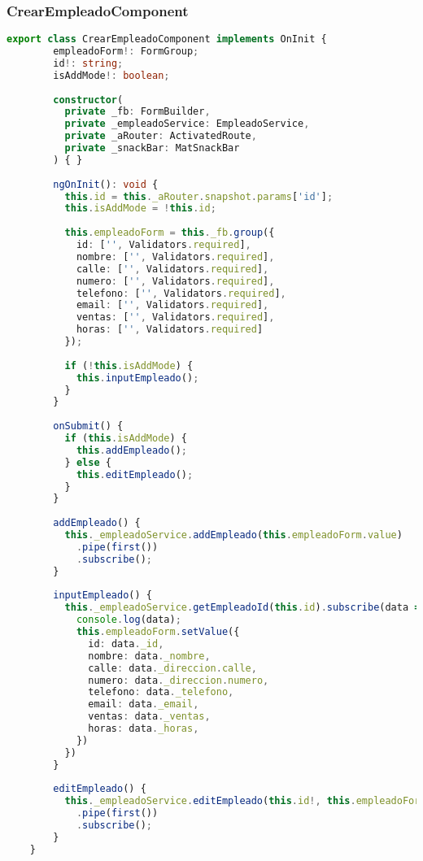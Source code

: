 \documentclass[a4paper]{article} %
\begin{document}
\subsubsection{CrearEmpleadoComponent}
\begin{lstlisting}[language=Typescript]
	export class CrearEmpleadoComponent implements OnInit {
		empleadoForm!: FormGroup;
		id!: string;
		isAddMode!: boolean;
	  
		constructor(
		  private _fb: FormBuilder,
		  private _empleadoService: EmpleadoService,
		  private _aRouter: ActivatedRoute,
		  private _snackBar: MatSnackBar
		) { }
	  
		ngOnInit(): void {
		  this.id = this._aRouter.snapshot.params['id'];
		  this.isAddMode = !this.id;
	  
		  this.empleadoForm = this._fb.group({
			id: ['', Validators.required],
			nombre: ['', Validators.required],
			calle: ['', Validators.required],
			numero: ['', Validators.required],
			telefono: ['', Validators.required],
			email: ['', Validators.required],
			ventas: ['', Validators.required],
			horas: ['', Validators.required]
		  });
	  
		  if (!this.isAddMode) {
			this.inputEmpleado();
		  }
		}
	  
		onSubmit() {
		  if (this.isAddMode) {
			this.addEmpleado();
		  } else {
			this.editEmpleado();
		  }
		}
	  
		addEmpleado() {
		  this._empleadoService.addEmpleado(this.empleadoForm.value)
			.pipe(first())
			.subscribe();
		}
	  
		inputEmpleado() {
		  this._empleadoService.getEmpleadoId(this.id).subscribe(data => {
			console.log(data);
			this.empleadoForm.setValue({
			  id: data._id,
			  nombre: data._nombre,
			  calle: data._direccion.calle,
			  numero: data._direccion.numero,
			  telefono: data._telefono,
			  email: data._email,
			  ventas: data._ventas,
			  horas: data._horas,
			})
		  })
		}
	  
		editEmpleado() {
		  this._empleadoService.editEmpleado(this.id!, this.empleadoForm.value)
			.pipe(first())
			.subscribe();
		}
	}
\end{lstlisting}\clearpage
\end{document}

